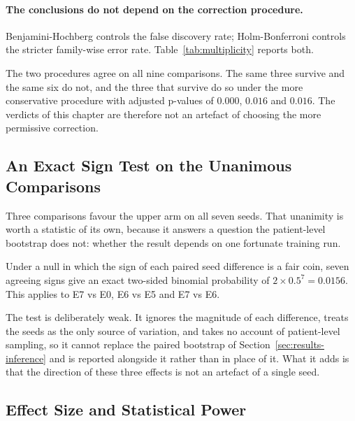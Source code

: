 \documentclass[12pt,a4paper]{report}
\begin{document}
\paragraph{The conclusions do not depend on the correction procedure.}
Benjamini-Hochberg controls the false discovery rate; Holm-Bonferroni controls
the stricter family-wise error rate. Table~\ref{tab:multiplicity} reports both.

\begin{table}[htbp]
  \centering
  \caption{The nine primary QWK contrasts under Benjamini-Hochberg and under
  Holm-Bonferroni. Generated by \texttt{implementation/make\_figures.py} from
  the same p-values as Table~\ref{tab:comparisons}.}
  \label{tab:multiplicity}
  
\end{table}

The two procedures agree on all nine comparisons. The same three survive and the
same six do not, and the three that survive do so under the more conservative
procedure with adjusted p-values of $0.000$, $0.016$ and $0.016$. The verdicts
of this chapter are therefore not an artefact of choosing the more permissive
correction.

\subsection{An Exact Sign Test on the Unanimous Comparisons}

Three comparisons favour the upper arm on all seven seeds. That unanimity is
worth a statistic of its own, because it answers a question the patient-level
bootstrap does not: whether the result depends on one fortunate training run.

Under a null in which the sign of each paired seed difference is a fair coin,
seven agreeing signs give an exact two-sided binomial probability of
$2 \times 0.5^{7} = 0.0156$. This applies to E7 vs E0, E6 vs E5 and E7 vs E6.

The test is deliberately weak. It ignores the magnitude of each difference,
treats the seeds as the only source of variation, and takes no account of
patient-level sampling, so it cannot replace the paired bootstrap of
Section~\ref{sec:results-inference} and is reported alongside it rather than in
place of it. What it adds is that the direction of these three effects is not an
artefact of a single seed.

\subsection{Effect Size and Statistical Power}
\label{sec:results-power}
\end{document}
